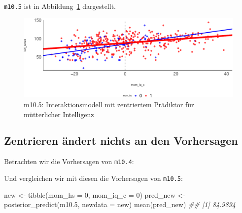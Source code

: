 \documentclass[
  a4paper,
  DIV=11]{scrreprt}
\newenvironment{Shaded}{\begin{snugshade}}{\end{snugshade}}
\newcommand{\AttributeTok}[1]{\textcolor[rgb]{0.40,0.45,0.13}{#1}}
\newcommand{\DecValTok}[1]{\textcolor[rgb]{0.68,0.00,0.00}{#1}}
\newcommand{\DocumentationTok}[1]{\textcolor[rgb]{0.37,0.37,0.37}{\textit{#1}}}
\newcommand{\FloatTok}[1]{\textcolor[rgb]{0.68,0.00,0.00}{#1}}
\newcommand{\FunctionTok}[1]{\textcolor[rgb]{0.28,0.35,0.67}{#1}}
\newcommand{\NormalTok}[1]{\textcolor[rgb]{0.00,0.23,0.31}{#1}}
\newcommand{\OtherTok}[1]{\textcolor[rgb]{0.00,0.23,0.31}{#1}}
\newcommand{\SpecialCharTok}[1]{\textcolor[rgb]{0.37,0.37,0.37}{#1}}
\theoremstyle{definition}
\theoremstyle{remark}
\begin{document}
\texttt{m10.5} ist in Abbildung~\ref{fig-m105} dargestellt.

\begin{figure}

{\centering \includegraphics{./metrische-AV_files/figure-pdf/fig-m105-1.pdf}

}

\caption{\label{fig-m105}m10.5: Interaktionsmodell mit zentriertem
Prädiktor für mütterlicher Intelligenz}

\end{figure}

\hypertarget{zentrieren-uxe4ndert-nichts-an-den-vorhersagen}{%
\subsection{Zentrieren ändert nichts an den
Vorhersagen}\label{zentrieren-uxe4ndert-nichts-an-den-vorhersagen}}

Betrachten wir die Vorhersagen von \texttt{m10.4}:

\begin{Shaded}
\end{Shaded}

Und vergleichen wir mit diesen die Vorhersagen von \texttt{m10.5}:

\begin{Shaded}
\begin{Highlighting}[]
\NormalTok{new }\OtherTok{\textless{}{-}} \FunctionTok{tibble}\NormalTok{(}\AttributeTok{mom\_hs =} \DecValTok{0}\NormalTok{, }\AttributeTok{mom\_iq\_c =} \DecValTok{0}\NormalTok{)}
\NormalTok{pred\_new }\OtherTok{\textless{}{-}} \FunctionTok{posterior\_predict}\NormalTok{(m10}\FloatTok{.5}\NormalTok{, }\AttributeTok{newdata =}\NormalTok{ new)}
\FunctionTok{mean}\NormalTok{(pred\_new)}
\DocumentationTok{\#\# [1] 84.9894}
\end{Highlighting}
\end{Shaded}
\end{document}
